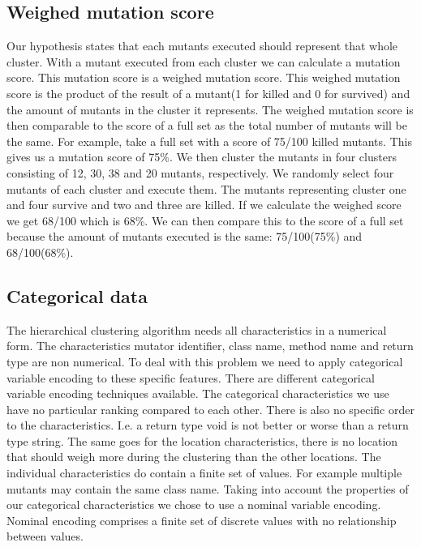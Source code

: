 \documentclass[../../main]{subfiles}
\begin{document}
\subsection{Weighed mutation score}
\label{ch:weighed_score}
Our hypothesis states that each mutants executed should represent that whole cluster.
With a mutant executed from each cluster we can calculate a mutation score.
This mutation score is a weighed mutation score.
This weighed mutation score is the product of the result of a mutant(1 for killed and 0 for survived) and the amount of mutants in the cluster it represents.
The weighed mutation score is then comparable to the score of a full set as the total number of mutants will be the same.
\newline
For example, take a full set with a score of 75/100 killed mutants. 
This gives us a mutation score of 75\%. 
We then cluster the mutants in four clusters consisting of 12, 30, 38 and 20 mutants, respectively.
We randomly select four mutants of each cluster and execute them.
The mutants representing cluster one and four survive and two and three are killed.
If we calculate the weighed score we get 68/100 which is 68\%.
We can then compare this to the score of a full set because the amount of mutants executed is the same: 75/100(75\%) and 68/100(68\%).

\subsection{Categorical data}
The hierarchical clustering algorithm needs all characteristics in a numerical form\cite{Vijaya2019ComparativeClustering}.
The characteristics mutator identifier, class name, method name and return type are non numerical.
To deal with this problem we need to apply categorical variable encoding to these specific features.
There are different categorical variable encoding techniques available\cite{Potdar2017AClassifiers}.
The categorical characteristics we use have no particular ranking compared to each other.
There is also no specific order to the characteristics.
I.e. a return type void is not better or worse than a return type string.
The same goes for the location characteristics, there is no location that should weigh more during the clustering than the other locations.
The individual characteristics do contain a finite set of values.
For example multiple mutants may contain the same class name.
Taking into account the properties of our categorical characteristics we chose to use a nominal variable encoding.
Nominal encoding comprises a finite set of discrete values with no relationship between values\cite{Potdar2017AClassifiers}.
\end{document}
